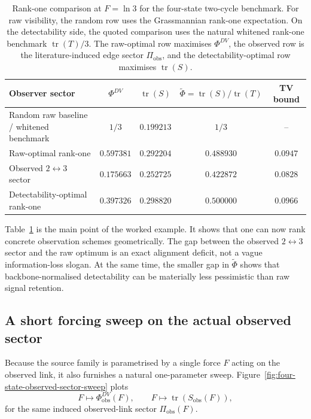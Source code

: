 \documentclass[11pt,a4paper]{article}
\numberwithin{equation}{section}
\theoremstyle{thmcompact}
\theoremstyle{remark}
\begin{document}
\begin{table}[t]
\centering
\caption{Rank-one comparison at \(F=\ln 3\) for the four-state two-cycle benchmark. For raw visibility, the random row uses the Grassmannian rank-one expectation. On the detectability side, the quoted comparison uses the natural whitened rank-one benchmark \(\operatorname{tr}(T)/3\). The raw-optimal row maximises \(\Phi^{DV}\), the observed row is the literature-induced edge sector \(\Pi_{\mathrm{obs}}\), and the detectability-optimal row maximises \(\operatorname{tr}(S)\).}
\label{tab:four-state-observer-comparison}
\begin{tabular}{lcccc}
\toprule
Observer sector & \(\Phi^{DV}\) & \(\operatorname{tr}(S)\) & \(\widetilde\Phi=\operatorname{tr}(S)/\operatorname{tr}(T)\) & TV bound \\
\midrule
Random raw baseline / whitened benchmark & \(1/3\) & \(0.199213\) & \(1/3\) & -- \\
Raw-optimal rank-one & \(0.597381\) & \(0.292204\) & \(0.488930\) & \(0.0947\) \\
Observed \(2\leftrightarrow 3\) sector & \(0.175663\) & \(0.252725\) & \(0.422872\) & \(0.0828\) \\
Detectability-optimal rank-one & \(0.397326\) & \(0.298820\) & \(0.500000\) & \(0.0966\) \\
\bottomrule
\end{tabular}
\end{table}

Table~\ref{tab:four-state-observer-comparison} is the main point of the worked example. It shows that one can now rank concrete observation schemes geometrically. The gap between the observed \(2\leftrightarrow 3\) sector and the raw optimum is an exact alignment deficit, not a vague information-loss slogan. At the same time, the smaller gap in \(\widetilde\Phi\) shows that backbone-normalised detectability can be materially less pessimistic than raw signal retention.

\subsection{A short forcing sweep on the actual observed sector}

Because the source family is parametrised by a single force \(F\) acting on the observed link, it also furnishes a natural one-parameter sweep. Figure~\ref{fig:four-state-observed-sector-sweep} plots
\begin{equation}
F\mapsto \Phi_{\mathrm{obs}}^{DV}(F),
\qquad
F\mapsto \operatorname{tr}(S_{\mathrm{obs}}(F)),
\end{equation}
for the same induced observed-link sector \(\Pi_{\mathrm{obs}}(F)\).
\end{document}
